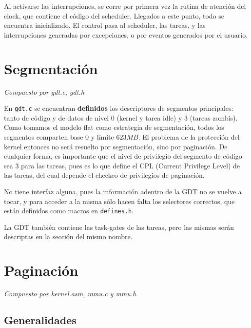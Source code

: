 \documentclass{article}
\begin{document}
	Al activarse las interrupciones, se corre por primera vez la rutina de atención del clock, que contiene el código del scheduler. Llegados a este punto, todo se encuentra inicializado. El control pasa al scheduler, las tareas, y las interrupciones generadas por excepciones, o por eventos generados por el usuario.


	\section{Segmentación}
	\vspace{-1cm}
	\begin{flushright}
	\textit{Compuesto por gdt.c, gdt.h}
	\end{flushright}

    En \texttt{gdt.c} se encuentran \textbf{definidos} los descriptores de segmentos principales:
    tanto de código y de datos de nivel 0 (kernel y tarea idle) y 3 (tareas zombis). Como tomamos el
    modelo flat como estrategia de segmentación, todos los segmentos comparten base $0$ y límite
    $623MB$. El problema de la protección del kernel entonces no será resuelto por segmentación,
    sino por paginación. De cualquier forma, es importante que el nivel de privilegio del segmento
    de código sea 3 para las tareas, pues es lo que define el CPL (Current Privilege Level) de las
    tareas, del cual depende el checkeo de privilegios de paginación.

    No tiene interfaz alguna, pues la información adentro de la GDT no se vuelve a tocar, y para
    acceder a la misma sólo hacen falta los selectores correctos, que están definidos como macros en
    \texttt{defines.h}.

    La GDT también contiene las task-gates de las tareas, pero las mismas serán descriptas en la
    sección del mismo nombre.


	\section{Paginación}
	\vspace{-1cm}
	\begin{flushright}
	\textit{Compuesto por kernel.asm, mmu.c y mmu.h}
	\end{flushright}

	\subsection*{Generalidades}
\end{document}
